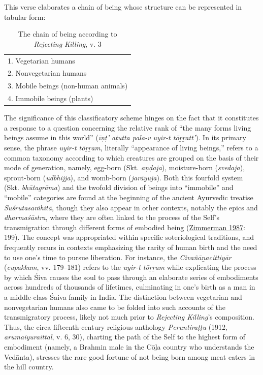 This verse elaborates a chain of being whose structure can be represented in tabular form:


\begin{table}[ht!]\label{tab1}\centering
\caption{The chain of being according to \emph{Rejecting Killing}, v. 3}
\begin{tabular}{l}\toprule

	
	1. Vegetarian humans \\
      
	2. Nonvegetarian humans \\
      
	3. Mobile beings (non-human animals) \\
      
	4. Immobile beings (plants) \\\bottomrule
      
      
\end{tabular}
\end{table}
      

The significance of this classificatory scheme hinges on the fact that it constitutes a response to a question concerning the relative rank of “the many forms living beings assume in this world” (\emph{īṇṭ’ aṭutta pala-v uyir-t tōṟṟatt’}). In its primary sense, the phrase \emph{uyir-t tōṟṟam}, literally “appearance of living beings,” refers to a common taxonomy according to which creatures are grouped on the basis of their mode of generation, namely, egg-born (Skt. \emph{aṇḍaja}), moisture-born (\emph{svedaja}), sprout-born (\emph{udbhijja}), and womb-born (\emph{jarāyuja}). Both this fourfold system (Skt. \emph{bhūtagrāma}) and the twofold division of beings into “immobile” and “mobile” categories are found at the beginning of the ancient Ayurvedic treatise \emph{{Suśrutasaṁhitā}}, though they also appear in other contexts, notably the epics and \emph{dharmaśāstra}, where they are often linked to the process of the Self’s transmigration through different forms of embodied being (\hyperref[Zimmerman1987]{Zimmerman 1987}: 199). The concept was appropriated within specific soteriological traditions, and frequently recurs in contexts emphasizing the rarity of human birth and the need to use one’s time to pursue liberation. For instance, the \emph{{Civañāṉacittiyār}} (\emph{cupakkam}, vv. 179–181) refers to the \emph{uyir-t tōṟṟam} while explicating the process by which Śiva causes the soul to pass through an elaborate series of embodiments across hundreds of thousands of lifetimes, culminating in one’s birth as a man in a middle-class Śaiva family in India. The distinction between vegetarian and nonvegetarian humans also came to be folded into such accounts of the transmigratory process, likely not much prior to \emph{Rejecting Killing}’s composition. Thus, the circa fifteenth-century religious anthology \emph{{Peruntiraṭṭu}} (1912, \emph{arumaiyuraittal}, v. 6, 30), charting the path of the Self to the highest form of embodiment (namely, a Brahmin male in the Cōḻa country who understands the Vedānta), stresses the rare good fortune of not being born among meat eaters in the hill country.


